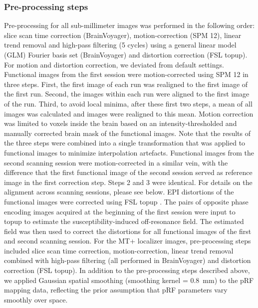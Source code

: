 \subsubsection{Pre-processing steps}
Pre-processing for all sub-millimeter images was performed in the following order: slice scan time correction (BrainVoyager), motion-correction (SPM 12), linear trend removal and high-pass filtering (5 cycles) using a general linear model (GLM) Fourier basis set (BrainVoyager) and distortion correction (FSL topup). For motion and distortion correction, we deviated from default settings. Functional images from the first session were motion-corrected using SPM 12 in three steps. First, the first image of each run was realigned to the first image of the first run. Second, the images within each run were aligned to the first image of the run. Third, to avoid local minima, after these first two steps, a mean of all images was calculated and images were realigned to this mean. Motion correction was limited to voxels inside the brain based on an intensity-thresholded and manually corrected brain mask of the functional images. Note that the results of the three steps were combined into a single transformation that was applied to functional images to minimize interpolation artefacts. Functional images from the second scanning session were motion-corrected in a similar vein, with the difference that the first functional image of the second session served as reference image in the first correction step. Steps 2 and 3 were identical. For details on the alignment across scanning sessions, please see below. EPI distortions of the functional images were corrected using FSL topup \parencite{Andersson2003, Smith2004}. The pairs of opposite phase encoding images acquired at the beginning of the first session were input to topup to estimate the susceptibility-induced off-resonance field. The estimated field was then used to correct the distortions for all functional images of the first and second scanning session. For the MT+ localizer images, pre-processing steps included slice scan time correction, motion-correction, linear trend removal combined with high-pass filtering (all performed in BrainVoyager) and distortion correction (FSL topup). In addition to the pre-processing steps described above, we applied Gaussian spatial smoothing (smoothing kernel = 0.8~mm) to the pRF mapping data, reflecting the prior assumption that pRF parameters vary smoothly over space.

